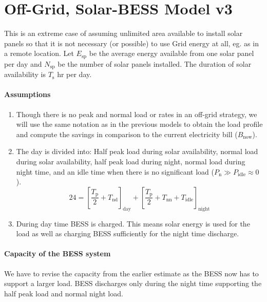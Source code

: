 
\section{Off-Grid, Solar-BESS Model v3}
This is an extreme case of assuming unlimited area available to
install solar panels so that it is not necessary (or possible) to use
Grid energy at all, eg. as in a remote location. Let $E_\text{sp}$ be the
average energy available from one solar panel per day and $N_\text{sp}$ be
the number of solar panels installed. The duration of solar availability
is $T_\text{s}$ hr per day.

\paragraph{Assumptions}
\begin{enumerate}
    \item Though there is no peak and normal load or rates in an off-grid strategy,
    we will use the same notation as in the previous models to obtain the
    load profile and compute the savings in comparison to the current electricity bill
    ($B_\text{now}$). 
    \item The day is divided into: Half peak load during solar availability,
    normal load during solar availability, 
    half peak load during night, normal load during night time, and an idle time 
    when there is no significant load ($P_\text{n} \gg P_\text{idle}\approx 0$).
    \begin{equation}
        24 = \left[ \frac{T_\text{p}}{2} + T_\text{nd} \right]_\text{day} 
        + \left[ \frac{T_\text{p}}{2} + T_\text{nn} + T_\text{idle} \right]_\text{night}
    \end{equation}
    \item During day time BESS is charged. This means solar
    energy is used for the load as well as charging BESS sufficiently
    for the night time discharge.

\end{enumerate}

\paragraph{Capacity of the BESS system} We have to revise the capacity from the
earlier estimate as the BESS now has to support a larger load.  BESS
discharges only during the night time supporting the half peak load and normal night load. 


